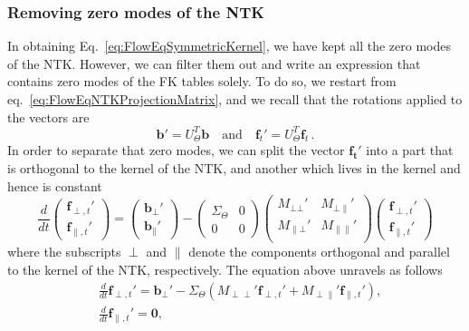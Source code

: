 \documentclass[11pt]{article}
\begin{document}
\subsubsection*{Removing zero modes of the NTK}
In obtaining Eq.~\eqref{eq:FlowEqSymmetricKernel}, we have kept all the zero modes of the NTK.
However, we can filter them out and write an expression that contains zero modes of the FK tables
solely. To do so, we restart from eq.~\eqref{eq:FlowEqNTKProjectionMatrix}, and we recall that the
rotations applied to the vectors are
\begin{equation}
  \pmb{b}' = U_{\Theta}^T \pmb{b} \quad \text{and} \quad \pmb{f}_t' = U_{\Theta}^T \pmb{f}_t\,.
\end{equation}
In order to separate that zero modes, we can split the
vector $\pmb{f_t'}$ into a part that is orthogonal to the kernel of the NTK, and another
which lives in the kernel and hence is constant
\begin{equation}
  \frac{d}{dt} 
  \left(
    \begin{matrix}
      \pmb{f}_{\perp,t}' \\
      \pmb{f}_{\parallel,t}'
    \end{matrix}
  \right)
  =
  \left(
    \begin{matrix}
      \pmb{b}_{\perp}' \\
      \pmb{b}_{\parallel}'
    \end{matrix}
  \right)
  -
  \left(
    \begin{matrix}
      \Sigma_{\Theta} & 0 \\
      0 & 0
    \end{matrix}
  \right)
  \left(
    \begin{matrix}
      M_{\bot\bot}' & M_{\bot \parallel}' \\
      M_{\parallel\bot}' & M_{\parallel \parallel}' \\
    \end{matrix}
  \right)
  \left(
    \begin{matrix}
      \pmb{f}_{\perp,t}' \\
      \pmb{f}_{\parallel,t}'
    \end{matrix}
  \right)
\end{equation}
where the subscripts $\perp$ and $\parallel$ denote the components orthogonal
and parallel to the kernel of the NTK, respectively. The equation above unravels
as follows
\begin{align}
  & \frac{d}{dt} \pmb{f}_{\perp,t}' = \pmb{b}_{\perp}' - 
    \Sigma_{\Theta} \left( M_{\perp \perp}' \pmb{f}_{\perp,t}' + 
    M_{\perp \parallel}' \pmb{f}_{\parallel,t}' \right),\\[5pt]
  & \frac{d}{dt} \pmb{f}_{\parallel,t}' = \pmb{0} ,
\end{align}
\end{document}
